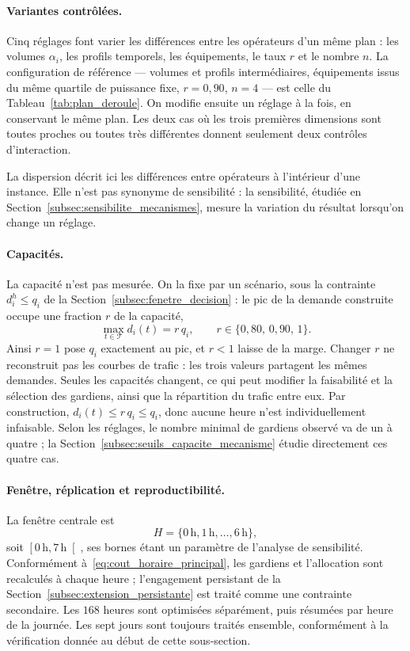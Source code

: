 \paragraph{Variantes contrôlées.}
Cinq réglages font varier les différences entre les opérateurs d'un même
plan : les volumes \(\alpha_i\), les profils temporels, les équipements, le
taux \(r\) et le nombre \(n\). La configuration de référence --- volumes et
profils intermédiaires, équipements issus du même quartile de puissance fixe,
\(r=0{,}90\), \(n=4\) --- est celle du Tableau~\ref{tab:plan_deroule}. On
modifie ensuite un réglage à la fois, en conservant le même plan. Les deux cas
où les trois premières dimensions sont toutes proches ou toutes très
différentes donnent seulement deux contrôles d'interaction.

La dispersion décrit ici les différences entre opérateurs à l'intérieur
d'une instance. Elle n'est pas synonyme de sensibilité : la sensibilité,
étudiée en Section~\ref{subsec:sensibilite_mecanismes}, mesure la variation
du résultat lorsqu'on change un réglage.

\paragraph{Capacités.}
La capacité n'est pas mesurée. On la fixe par un scénario, sous la
contrainte \(d_i^h\leqslant q_i\) de la
Section~\ref{subsec:fenetre_decision} : le pic de la demande construite
occupe une fraction \(r\) de la capacité,
\begin{equation}
    \max_{t\in\mathcal T}d_i(t)=r\,q_i,
    \qquad
    r\in\{0{,}80,\,0{,}90,\,1\}.
    \label{eq:capacite_scenario}
\end{equation}
Ainsi \(r=1\) pose \(q_i\) exactement au pic, et \(r<1\) laisse de la
marge. Changer \(r\) ne reconstruit pas les courbes de trafic : les trois
valeurs partagent les mêmes demandes. Seules les capacités changent, ce qui
peut modifier la faisabilité et la sélection des gardiens, ainsi que la
répartition du trafic entre eux. Par construction,
\(d_i(t)\leqslant r\,q_i\leqslant q_i\), donc aucune heure n'est
individuellement infaisable. Selon les réglages, le nombre minimal de
gardiens observé va de un à quatre ; la
Section~\ref{subsec:seuils_capacite_mecanisme} étudie directement ces quatre
cas.

\paragraph{Fenêtre, réplication et reproductibilité.}
La fenêtre centrale est
\[
    H=\{0\,\mathrm{h},1\,\mathrm{h},\ldots,6\,\mathrm{h}\},
\]
soit \(\left[0\,\mathrm{h},7\,\mathrm{h}\right[\), ses bornes étant un paramètre de
l'analyse de sensibilité. Conformément à~\eqref{eq:cout_horaire_principal},
les gardiens et l'allocation sont recalculés à chaque heure ; l'engagement
persistant de la Section~\ref{subsec:extension_persistante} est traité comme
une contrainte secondaire. Les \(168\) heures sont optimisées séparément, puis
résumées par heure de la journée. Les sept jours sont toujours traités
ensemble, conformément à la vérification donnée au début de cette
sous-section.

